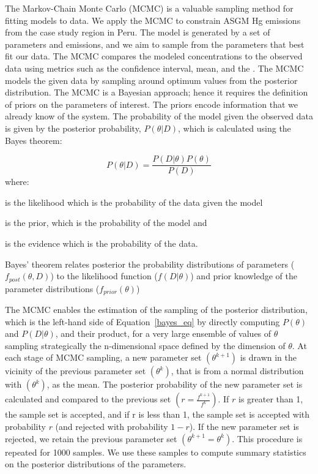 \begin{flushleft}
The Markov-Chain Monte Carlo (MCMC) is a valuable sampling method for fitting models to data\cite{hogg_data_2018}. We apply the MCMC to constrain ASGM Hg emissions from the case study region in Peru.  The model is generated by a set of parameters and emissions, and we aim to sample from the parameters that best fit our data. The MCMC compares the modeled concentrations to the observed data using metrics such as the \nft confidence interval, mean, and the \iq. The MCMC models the given data by sampling around optimum values from the posterior distribution. The MCMC is a Bayesian approach; hence it requires the definition of priors on the parameters of interest. The priors encode information that we already know of the system. The probability of the model given the observed data is given by the posterior probability, $P(\theta|D)$, which is calculated using the Bayes theorem:

\begin{equation}
\label{bayes_eq}
P(\theta|D)=\frac{P(D|\theta)P(\theta)}{P(D)}
\end{equation}
where:
\end{flushleft}

\begin{description}[leftmargin=!,labelwidth={3 em}]
    \item [$P(D|\theta)$] is the likelihood which is the probability of the data given the model
    \item [$P(\theta)$] is the prior, which is the probability of the model and 
    \item [$P(D)$] is the evidence which is the probability of the data.
\end{description}

Bayes’ theorem relates posterior the probability distributions of parameters ($f_{post}(\theta, D)$) to the likelihood function ($f(D | \theta)$) and prior knowledge of the parameter distributions ($f_{prior}(\theta)$)

\begin{flushleft}
The MCMC enables the estimation of the sampling of the posterior distribution, which is the left-hand side of Equation~\ref{bayes_eq} by directly computing $P(\theta)$ and $P(D|\theta)$, and their product, for a very large ensemble of values of $\theta$ sampling strategically the n-dimensional space defined by the dimension of $\theta$\cite{brasseur_modeling_2017}. At each stage of MCMC sampling, a new parameter set $(\theta^{k+1})$ is drawn in the vicinity of the previous parameter set $(\theta^{k})$, that is from a normal distribution with $(\theta^{k})$, as the mean. The posterior probability of the new parameter set is calculated and compared to the previous set $(r = \frac{f^{k+1}}{f^k})$. If $r$ is greater than 1, the sample set is accepted, and if r is less than 1, the sample set is accepted with probability $r$ (and rejected with probability $1-r$). If the new parameter set is rejected, we retain the previous parameter set $(\theta^{k+1}= \theta^k)$. This procedure is repeated for 1000 samples. We use these samples to compute summary statistics on the posterior distributions of the parameters. 
\end{flushleft}


